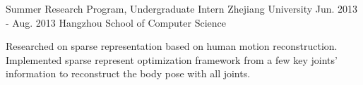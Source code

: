 \begin{cventries}
  \cventry
    {Summer Research Program, Undergraduate Intern}
    {Zhejiang University}
    {Jun. 2013 - Aug. 2013}
    {Hangzhou}
    {School of Computer Science}
    {
      \begin{cvitems}
        \item {Researched on sparse representation based on human motion reconstruction. Implemented sparse represent optimization framework from a few key joints’ information to reconstruct the body pose with all joints.}
      \end{cvitems}
    }
\end{cventries}
